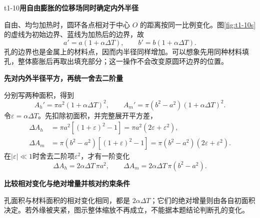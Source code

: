 \LectureAnswerSection

\begin{drillsolution}{t1-10}\textbf{用自由膨胀的位移场同时确定内外半径}\par\nobreak
自由、均匀加热时，圆环各点相对于中心 $O$ 的距离按同一比例变化。图\ref{fig:t1-10s}的虚线为初始边界、蓝线为加热后的边界，故
\[a'=a(1+\alpha\Delta T),\qquad b'=b(1+\alpha\Delta T).\]
孔的边界也是金属上的材料点，因而内半径同样增加。可以想象先用同种材料填孔，整体膨胀后再取出填充部分；这一操作不会改变原圆环边界的位置。



\par\medskip{}\noindent\textbf{先对内外半径平方，再统一舍去二阶量}\par\nobreak
分别写两种面积，得到
\[A_h'=\pi a^2(1+\alpha\Delta T)^2,\qquad
A_m'=\pi(b^2-a^2)(1+\alpha\Delta T)^2.\]
令$\varepsilon=\alpha\Delta T$。先扣除初面积，并完整展开平方差，
\[
\begin{aligned}
\Delta A_h&=\pi a^2[(1+\varepsilon)^2-1]
=\pi a^2(2\varepsilon+\varepsilon^2),\\
\Delta A_m&=\pi(b^2-a^2)[(1+\varepsilon)^2-1]
=\pi(b^2-a^2)(2\varepsilon+\varepsilon^2).
\end{aligned}
\]
在$|\varepsilon|\ll1$时舍去二阶项$\varepsilon^2$，才有一阶变化
\[\boxed{\Delta A_h=2\alpha\Delta T\,\pi a^2,\qquad
\Delta A_m=2\alpha\Delta T\,\pi(b^2-a^2)}.\]


\par\medskip{}\noindent\textbf{比较相对变化与绝对增量并核对约束条件}\par\nobreak
孔面积与材料面积的相对变化相同，都是 $2\alpha\Delta T$；它们的绝对增量则由各自初面积决定。若外缘被夹紧，图示整体缩放不再成立，不能据本题结论判断孔的变化。
\end{drillsolution}
